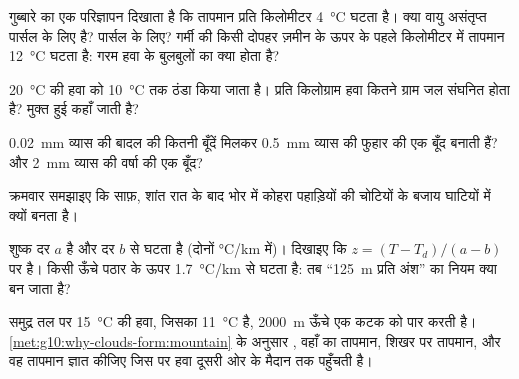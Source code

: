 \begin{exercise}[$\star\star$]\label{exo:g10:why-clouds-form:8}
गुब्बारे का एक परिज्ञापन दिखाता है कि तापमान प्रति किलोमीटर \qty{4}{\degreeCelsius}
घटता है। क्या वायु असंतृप्त पार्सल के लिए  है?  पार्सल के लिए?
गर्मी की किसी दोपहर ज़मीन के ऊपर के पहले किलोमीटर में तापमान \qty{12}{\degreeCelsius}
घटता है: गरम हवा के बुलबुलों का क्या होता है?
\end{exercise}

\begin{exercise}[$\star\star$]\label{exo:g10:why-clouds-form:9}
\qty{20}{\degreeCelsius} की  हवा को
\qty{10}{\degreeCelsius} तक ठंडा किया जाता है। प्रति किलोग्राम हवा कितने ग्राम जल
संघनित होता है? मुक्त हुई  कहाँ जाती है?
\end{exercise}

\begin{exercise}[$\star\star$]\label{exo:g10:why-clouds-form:10}
\qty{0.02}{mm} व्यास की बादल की कितनी बूँदें मिलकर \qty{0.5}{mm} व्यास की फुहार की
एक बूँद बनाती हैं? और \qty{2}{mm} व्यास की वर्षा की एक बूँद?
\end{exercise}

\begin{exercise}[$\star\star$]\label{exo:g10:why-clouds-form:11}
क्रमवार समझाइए कि साफ़, शांत रात के बाद भोर में कोहरा पहाड़ियों की चोटियों के बजाय
घाटियों में क्यों बनता है।
\end{exercise}

\begin{exercise}[$\star\star\star$]\label{exo:g10:why-clouds-form:12}
शुष्क दर $a$ है और  दर $b$ से घटता है (दोनों
\unit{\degreeCelsius/km} में)। दिखाइए कि 
$z = (T - T_d)/(a - b)$ पर है। किसी ऊँचे पठार के ऊपर 
\qty{1.7}{\degreeCelsius/km} से घटता है: तब ``\qty{125}{m} प्रति अंश'' का नियम
क्या बन जाता है?
\end{exercise}

\begin{exercise}[$\star\star\star$]\label{exo:g10:why-clouds-form:13}
समुद्र तल पर \qty{15}{\degreeCelsius} की हवा, जिसका 
\qty{11}{\degreeCelsius} है, \qty{2000}{m} ऊँचे एक कटक को पार करती है।
\cref{met:g10:why-clouds-form:mountain} के अनुसार , वहाँ का
तापमान, शिखर पर तापमान, और वह तापमान ज्ञात कीजिए जिस पर
हवा दूसरी ओर के मैदान तक पहुँचती है।
\end{exercise}

